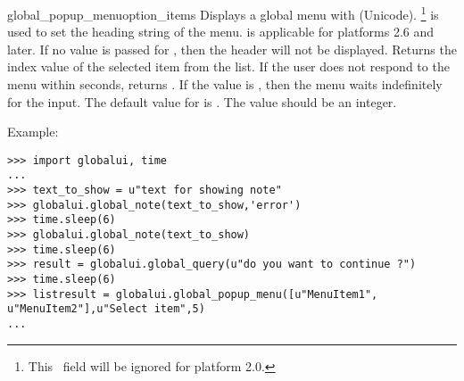 \begin{funcdesc}{global_popup_menu}{option_items} 
Displays a global menu with (Unicode). \footnote{This \
field will be ignored for platform 2.0.} is used to set the heading string of the 
menu.  is applicable for platforms 2.6 and later. If no value is 
passed for \var{header_text}, then the header will not be displayed. Returns the index value 
of the selected item from the list. If the user does not respond to the menu within 
 seconds, returns \code{None}. If the  value is , 
then the menu waits indefinitely for the input. The default value for \var{timeout} 
is \code{0}. The \var{timeout} value should be an integer.
\end{funcdesc}

Example:
\begin{verbatim}
>>> import globalui, time
...
>>> text_to_show = u"text for showing note"
>>> globalui.global_note(text_to_show,'error')
>>> time.sleep(6)
>>> globalui.global_note(text_to_show)
>>> time.sleep(6)
>>> result = globalui.global_query(u"do you want to continue ?")
>>> time.sleep(6)
>>> listresult = globalui.global_popup_menu([u"MenuItem1", u"MenuItem2"],u"Select item",5)
...   
\end{verbatim}
